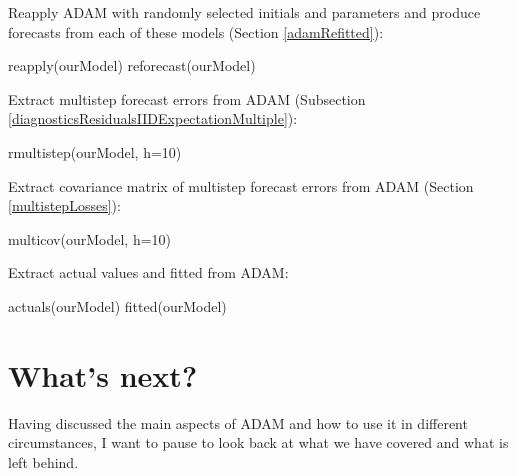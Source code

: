\documentclass[
]{book}
\newenvironment{Shaded}{\begin{snugshade}}{\end{snugshade}}
\newcommand{\AttributeTok}[1]{\textcolor[rgb]{0.77,0.63,0.00}{#1}}
\newcommand{\DecValTok}[1]{\textcolor[rgb]{0.00,0.00,0.81}{#1}}
\newcommand{\FunctionTok}[1]{\textcolor[rgb]{0.00,0.00,0.00}{#1}}
\newcommand{\NormalTok}[1]{#1}
\theoremstyle{definition}
\theoremstyle{definition}
\theoremstyle{definition}
\theoremstyle{definition}
\theoremstyle{remark}
\begin{document}
Reapply ADAM with randomly selected initials and parameters and produce forecasts from each of these models (Section \ref{adamRefitted}):

\begin{Shaded}
\begin{Highlighting}[]
\FunctionTok{reapply}\NormalTok{(ourModel)}
\FunctionTok{reforecast}\NormalTok{(ourModel)}
\end{Highlighting}
\end{Shaded}

Extract multistep forecast errors from ADAM (Subsection \ref{diagnosticsResidualsIIDExpectationMultiple}):

\begin{Shaded}
\begin{Highlighting}[]
\FunctionTok{rmultistep}\NormalTok{(ourModel, }\AttributeTok{h=}\DecValTok{10}\NormalTok{)}
\end{Highlighting}
\end{Shaded}

Extract covariance matrix of multistep forecast errors from ADAM (Section \ref{multistepLosses}):

\begin{Shaded}
\begin{Highlighting}[]
\FunctionTok{multicov}\NormalTok{(ourModel, }\AttributeTok{h=}\DecValTok{10}\NormalTok{)}
\end{Highlighting}
\end{Shaded}

Extract actual values and fitted from ADAM:

\begin{Shaded}
\begin{Highlighting}[]
\FunctionTok{actuals}\NormalTok{(ourModel)}
\FunctionTok{fitted}\NormalTok{(ourModel)}
\end{Highlighting}
\end{Shaded}

\hypertarget{conclusions}{%
\chapter{What's next?}\label{conclusions}}

Having discussed the main aspects of ADAM and how to use it in different circumstances, I want to pause to look back at what we have covered and what is left behind.
\end{document}

